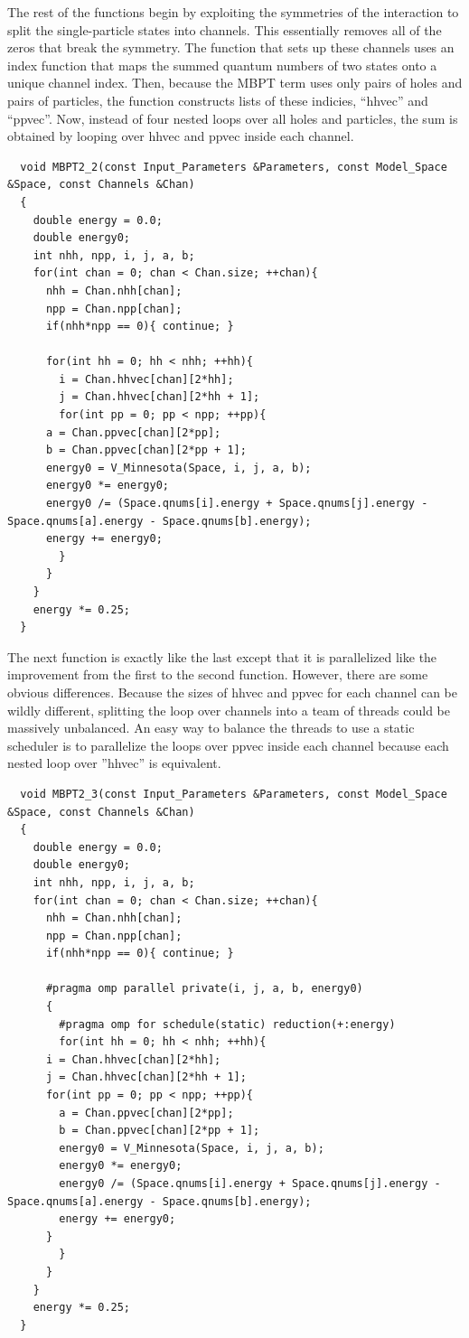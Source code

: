 The rest of the functions begin by exploiting the symmetries of the interaction to split the single-particle states into channels. This essentially removes all of the zeros that break the symmetry. The function that sets up these channels uses an index function that maps the summed quantum numbers of two states onto a unique channel index. Then, because the MBPT term uses only pairs of holes and pairs of particles, the function constructs lists of these indicies, ``hhvec'' and ``ppvec''. Now, instead of four nested loops over all holes and particles, the sum is obtained by looping over hhvec and ppvec inside each channel.

\begin{lstlisting}
  void MBPT2_2(const Input_Parameters &Parameters, const Model_Space &Space, const Channels &Chan)
  {
    double energy = 0.0;
    double energy0;
    int nhh, npp, i, j, a, b;
    for(int chan = 0; chan < Chan.size; ++chan){
      nhh = Chan.nhh[chan];
      npp = Chan.npp[chan];
      if(nhh*npp == 0){ continue; }
      
      for(int hh = 0; hh < nhh; ++hh){
        i = Chan.hhvec[chan][2*hh];
        j = Chan.hhvec[chan][2*hh + 1];
        for(int pp = 0; pp < npp; ++pp){
	  a = Chan.ppvec[chan][2*pp];
	  b = Chan.ppvec[chan][2*pp + 1];
	  energy0 = V_Minnesota(Space, i, j, a, b);
	  energy0 *= energy0;
	  energy0 /= (Space.qnums[i].energy + Space.qnums[j].energy - Space.qnums[a].energy - Space.qnums[b].energy);
	  energy += energy0;
        }
      }
    }
    energy *= 0.25;
  }
\end{lstlisting}

The next function is exactly like the last except that it is parallelized like the improvement from the first to the second function. However, there are some obvious differences. Because the sizes of hhvec and ppvec for each channel can be wildly different, splitting the loop over channels into a team of threads could be massively unbalanced. An easy way to balance the threads to use a static scheduler is to parallelize the loops over ppvec inside each channel because each nested loop over ''hhvec'' is equivalent.

\begin{lstlisting}
  void MBPT2_3(const Input_Parameters &Parameters, const Model_Space &Space, const Channels &Chan)
  {
    double energy = 0.0;
    double energy0;
    int nhh, npp, i, j, a, b;
    for(int chan = 0; chan < Chan.size; ++chan){
      nhh = Chan.nhh[chan];
      npp = Chan.npp[chan];
      if(nhh*npp == 0){ continue; }
      
      #pragma omp parallel private(i, j, a, b, energy0)
      {
        #pragma omp for schedule(static) reduction(+:energy)
        for(int hh = 0; hh < nhh; ++hh){
	  i = Chan.hhvec[chan][2*hh];
	  j = Chan.hhvec[chan][2*hh + 1];
	  for(int pp = 0; pp < npp; ++pp){
	    a = Chan.ppvec[chan][2*pp];
	    b = Chan.ppvec[chan][2*pp + 1];
	    energy0 = V_Minnesota(Space, i, j, a, b);
	    energy0 *= energy0;
	    energy0 /= (Space.qnums[i].energy + Space.qnums[j].energy - Space.qnums[a].energy - Space.qnums[b].energy);
	    energy += energy0;
	  }
        }
      }
    }
    energy *= 0.25;
  }
\end{lstlisting}

